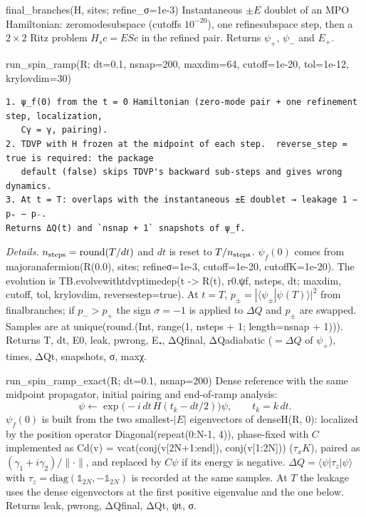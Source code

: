 \documentclass[11pt]{article}
\newcommand{\codeus}{\textunderscore\allowbreak}
\renewcommand{\code}[1]{{\ttfamily\let\_\codeus #1}}
\begin{document}
\begin{function}{final\_branches(H, sites; refine\_σ=1e-3)}
Instantaneous $\pm E$ doublet of an MPO Hamiltonian: \code{zero\_mode\_subspace} (cutoffs $10^{-20}$), one \code{refine\_subspace} step, then a $2\times2$ Ritz problem $H_s c=ES c$ in the refined pair. Returns $\psi_+$, $\psi_-$ and $E_+$.
\end{function}

\begin{function}{run\_spin\_ramp(R; dt=0.1, nsnap=200, maxdim=64, cutoff=1e-20, tol=1e-12, krylovdim=30)}
\begin{Verbatim}
1. ψ_f(0) from the t = 0 Hamiltonian (zero-mode pair + one refinement step, localization,
   Cγ = γ, pairing).
2. TDVP with H frozen at the midpoint of each step.  reverse_step = true is required: the package
   default (false) skips TDVP's backward sub-steps and gives wrong dynamics.
3. At t = T: overlaps with the instantaneous ±E doublet → leakage 1 − p₊ − p₋.
Returns ΔQ(t) and `nsnap + 1` snapshots of ψ_f.
\end{Verbatim}
\emph{Details.} $n_{\rm steps}=\mathrm{round}(T/dt)$ and $dt$ is reset to $T/n_{\rm steps}$. $\psi_f(0)$ comes from \code{majorana\_fermion(R(0.0), sites; refine\_σ=1e-3, cutoff=1e-20, cutoff\_K=1e-20)}. The evolution is \code{TB.evolve\_with\_tdvp\_timedep(t -> R(t), r0.ψf, nsteps, dt; maxdim, cutoff, tol, krylovdim, reverse\_step=true)}. At $t=T$, $p_\pm=|\langle\psi_\pm|\psi(T)\rangle|^2$ from \code{final\_branches}; if $p_->p_+$ the sign $\sigma=-1$ is applied to $\Delta Q$ and $p_\pm$ are swapped. Samples are at \code{unique(round.(Int, range(1, nsteps + 1; length=nsnap + 1)))}. Returns \code{T, dt, E0, leak, p\_wrong, E₊, ΔQ\_final, ΔQ\_adiabatic} ($=\Delta Q$ of $\psi_+$), \code{times, ΔQ\_t, snapshots, σ, maxχ}.
\end{function}

\begin{function}{run\_spin\_ramp\_exact(R; dt=0.1, nsnap=200)}
Dense reference with the same midpoint propagator, initial pairing and end-of-ramp analysis:
\[
\psi\leftarrow\exp\bigl(-i\,dt\,H(t_k-dt/2)\bigr)\psi,\qquad t_k=k\,dt .
\]
$\psi_f(0)$ is built from the two smallest-$|E|$ eigenvectors of \code{dense\_H(R, 0)}: localized by the position operator \code{Diagonal(repeat(0:N-1, 4))}, phase-fixed with $C$ implemented as \code{Cd(v) = vcat(conj(v[2N+1:end]), conj(v[1:2N]))} ($\tau_xK$), paired as $(\gamma_1+i\gamma_2)/\|\cdot\|$, and replaced by $C\psi$ if its energy is negative. $\Delta Q=\langle\psi|\tau_z|\psi\rangle$ with $\tau_z=\mathrm{diag}(\mathbb 1_{2N},-\mathbb 1_{2N})$ is recorded at the same samples. At $T$ the leakage uses the dense eigenvectors at the first positive eigenvalue and the one below. Returns \code{leak, p\_wrong, ΔQ\_final, ΔQ\_t, ψ\_t, σ}.
\end{function}
\end{document}
